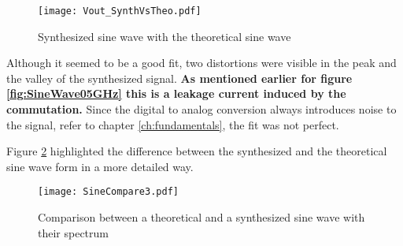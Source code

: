 \begin{figure}[htb!]
   \centering
   \texttt{[image: Vout\_SynthVsTheo.pdf]}
   \caption{Synthesized sine wave with the theoretical sine wave}
   \label{fig:SineWaveSynthVsTheoretical}
\end{figure}

Although it seemed to be a good fit, two distortions were visible in the peak and the valley of the synthesized signal.
\textbf{As mentioned earlier for figure \ref{fig:SineWave05GHz} this is a leakage current induced by the commutation.}
Since the digital to analog conversion always introduces noise to the signal, refer to chapter \ref{ch:fundamentals}, the fit was not perfect. 

Figure \ref{fig:SineCompare} highlighted the difference between the synthesized and the theoretical sine wave form in a more detailed way.

\begin{figure}[htb!]
	\centering
  \texttt{[image: SineCompare3.pdf]}
	\caption{Comparison between a theoretical and a synthesized sine wave with their spectrum}
	\label{fig:SineCompare}
\end{figure}

